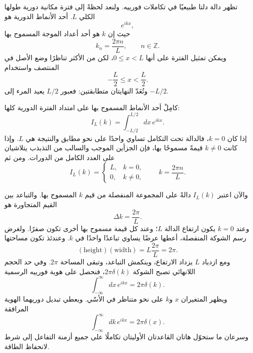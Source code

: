 تظهر دالة دلتا طبيعيًا في تكاملات فورييه. ولنعد لحظةً إلى فترة مكانية دورية طولها الكلي \(L\). أحد الأنماط الدورية هو
\begin{equation}
e^{ikx},
\end{equation}
حيث إن \(k\) هو أحد أعداد الموجة المسموح بها
\begin{equation}
k_n=\frac{2\pi n}{L},
\qquad n\in\mathbb Z.
\end{equation}
ويمكن تمثيل الفترة على أنها \(0\leq x<L\)، لكن من الأكثر تناظرًا وضع الأصل في المنتصف واستخدام
\begin{equation}
-\frac L2\leq x<\frac L2.
\end{equation}
وتُعَدّ النهايتان متطابقتين: فعبور \(L/2\) يعيد المرء إلى \(-L/2\).

كامِلْ أحد الأنماط المسموح بها على امتداد الفترة الدورية كلها:
\begin{equation}
I_L(k)=\int_{-L/2}^{L/2}dx\,e^{ikx}.
\end{equation}
إذا كان \(k=0\)، فالدالة تحت التكامل تساوي واحدًا على نحو مطابق والنتيجة هي \(L\). وإذا كانت \(k\neq0\) قيمةً مسموحًا بها، فإن الجزأين الموجب والسالب من التذبذب يتلاشيان على العدد الكامل من الدورات. ومن ثم
\begin{equation}
I_L(k)=
\begin{cases}
L,&k=0,\\[4pt]
0,&k\neq0,
\end{cases}
\qquad
k=\frac{2\pi n}{L}.
\end{equation}

والآن اعتبر \(I_L(k)\) دالةً على المجموعة المنفصلة من قيم \(k\) المسموح بها. والتباعد بين القيم المتجاورة هو
\begin{equation}
\Delta k=\frac{2\pi}{L}.
\end{equation}
وعند \(k=0\) يكون ارتفاع الدالة \(L\)؛ وعند كل قيمة مسموح بها أخرى تكون صفرًا. ولغرض رسم الشوكة المنفصلة، أعطها عرضًا يساوي تباعدًا واحدًا في \(k\). وعندئذ تكون مساحتها
\begin{equation}
(\text{height})(\text{width})
=L\frac{2\pi}{L}=2\pi.
\end{equation}
ومع ازدياد \(L\) يزداد الارتفاع، وينكمش التباعد، وتبقى المساحة \(2\pi\). وفي حد الحجم اللانهائي تصبح الشوكة \(2\pi\delta(k)\)، فنحصل على هوية فورييه الرسمية
\begin{equation}
\int_{-\infty}^{\infty}dx\,e^{ikx}=2\pi\delta(k).
\end{equation}
ويظهر المتغيران \(x\) و\(k\) على نحو متناظر في الأسّي. ويعطي تبديل دوريهما الهوية المرافقة
\begin{equation}
\int_{-\infty}^{\infty}dk\,e^{ikx}=2\pi\delta(x).
\end{equation}
وسرعان ما ستحوّل هاتان القاعدتان الأوليتان تكاملًا على جميع أزمنة التفاعل إلى شرط لانحفاظ الطاقة.

